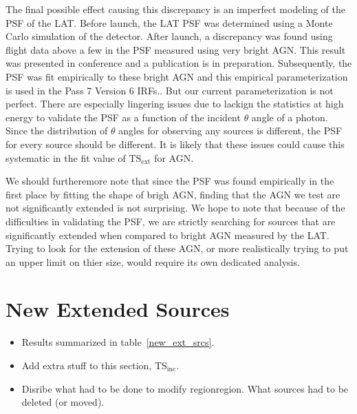\documentclass[preprint]{aastex}
\newcommand{\gev}{\text{GeV}\xspace}
\newcommand{\tsext}{{\ensuremath{\text{TS}_\text{ext}}}\xspace}
\newcommand{\tsinc}{\ensuremath{\text{TS}_\text{inc}}\xspace}
\begin{document}
The final possible effect causing this discrepancy is an imperfect
modeling of the PSF of the LAT.  Before launch, the LAT PSF
was determined using a Monte Carlo simulation of the detector.
After launch, a discrepancy was found using flight data above a
few \gev in the PSF measured using very bright AGN.  This result
was presented in conference and a publication is in preparation.
Subsequently, the PSF was fit empirically to these bright AGN and this
empirical parameterization is used in the Pass 7 Version 6 IRFs.\cite{
https://confluence.slac.stanford.edu/download/attachments/102860834/FermiSymp2011_CAPSF_v5_ROTH.pptx
}. But our current parameterization is not perfect. There are especially
lingering issues due to lackign the statistics at high energy to
validate the PSF as a function of the incident $\theta$ angle of a
photon. Since the distribution of $\theta$ angles for observing any
sources is different, the PSF for every source should be different.
It is likely that these issues could cause this systematic in the fit
value of \tsext for AGN.

We should furtheremore note that since the PSF was found empirically in
the first place by fitting the shape of brigh AGN, finding that the AGN we
test are not significantly extended is not surprising.  We hope to note
that because of the difficulties in validating the PSF, we are strictly
searching for sources that are significantly extended when compared to
bright AGN measured by the LAT. Trying to look for the extension of these
AGN, or more realistically trying to put an upper limit on thier size,
would require its own dedicated analysis.



\section{New Extended Sources}

\begin{itemize}
  \item Results summarized in table~\ref{new_ext_srcs}.
  \item Add extra stuff to this section, $\tsinc$.
  \item Disribe what had to be done to modify regionregion.
    What sources had to be deleted (or moved).

\end{itemize}
\end{document}
